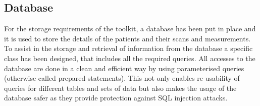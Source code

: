 \subsection{Database}
For the storage requirements of the toolkit, a database has been put in place and it is used to store the details of the patients and their scans and measurements. To assist in the storage and retrieval of information from the database a specific class has been designed, that includes all the required queries. All accesses to the database are done in a clean and efficient way by using parameterised queries (otherwise called prepared statements). This not only enables re-usability of queries for different tables and sets of data but also makes the usage of the database safer as they provide protection against SQL injection attacks. \\